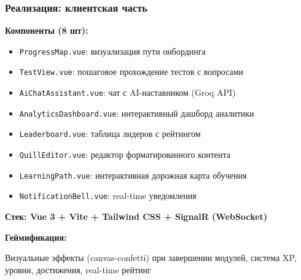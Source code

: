 \documentclass{beamer}
\begin{document}
\begin{frame}
    \frametitle{Реализация: клиентская часть}
    
    \textbf{Компоненты (8 шт):}
    \begin{itemize}
        \item \texttt{ProgressMap.vue}: визуализация пути онбординга
        \item \texttt{TestView.vue}: пошаговое прохождение тестов с вопросами
        \item \texttt{AiChatAssistant.vue}: чат с AI-наставником (Groq API)
        \item \texttt{AnalyticsDashboard.vue}: интерактивный дашборд аналитики
        \item \texttt{Leaderboard.vue}: таблица лидеров с рейтингом
        \item \texttt{QuillEditor.vue}: редактор форматированного контента
        \item \texttt{LearningPath.vue}: интерактивная дорожная карта обучения
        \item \texttt{NotificationBell.vue}: real-time уведомления
    \end{itemize}
    
    \vspace{0.2cm}
    \textbf{Стек: Vue 3 + Vite + Tailwind CSS + SignalR (WebSocket)}
    
    \vspace{0.2cm}
    \textbf{Геймификация:}
    
    Визуальные эффекты (canvas-confetti) при завершении модулей, система XP, уровни, достижения, real-time рейтинг
\end{frame}
\end{document}

